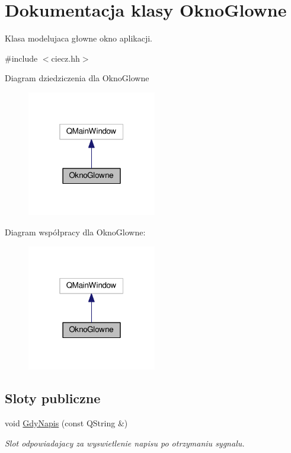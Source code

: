 \hypertarget{class_okno_glowne}{\section{Dokumentacja klasy Okno\-Glowne}
\label{class_okno_glowne}
}


Klasa modelujaca głowne okno aplikacji.  




{\ttfamily \#include $<$ciecz.\-hh$>$}



Diagram dziedziczenia dla Okno\-Glowne\nopagebreak
\begin{figure}[H]
\begin{center}
\leavevmode
\includegraphics[width=160pt]{class_okno_glowne__inherit__graph}
\end{center}
\end{figure}


Diagram współpracy dla Okno\-Glowne\-:\nopagebreak
\begin{figure}[H]
\begin{center}
\leavevmode
\includegraphics[width=160pt]{class_okno_glowne__coll__graph}
\end{center}
\end{figure}
\subsection*{Sloty publiczne}
\begin{DoxyCompactItemize}
\item 
void \hyperlink{class_okno_glowne_a2a59f13292adfead4ac821780220044a}{Gdy\-Napis} (const Q\-String \&)
\begin{DoxyCompactList}\small\item\em Slot odpowiadajacy za wyswietlenie napisu po otrzymaniu sygnalu. \end{DoxyCompactList}\end{DoxyCompactItemize}
